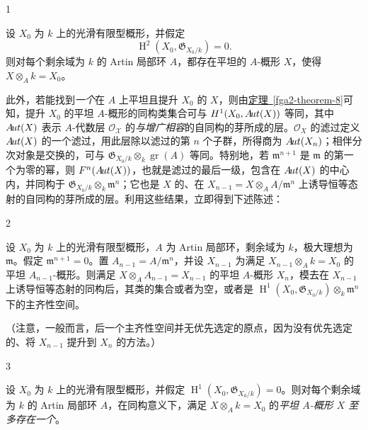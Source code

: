 \begin{corollary}{1}\label{fga2-theorem-8-corollary-1}\skipsinglepar
\par{}设 \(X_0\) 为 \(k\) 上的光滑有限型概形，并假定 \[       \operatorname {H}^2(X_0,\mathfrak {G}_{X_0/k})       = 0.     \] 则对每个剩余域为 \(k\) 的 Artin 局部环 \(A\)，都存在平坦的 \(A\)-概形 \(X\)，使得 \(X\otimes _A k=X_0\)。\end{corollary}
\par{}此外，若能找到\emph{一个}在 \(A\) 上平坦且提升 \(X_0\) 的 \(X\)，则由\hyperref[fga2-theorem-8]{定理~\ref*{fga2-theorem-8}}可知，提升 \(X_0\) 的平坦 \(A\)-概形的同构类集合可与 \(\operatorname {H}^1(X_0,\mathscr {A}\kern  -1.75pt\mathit {ut}(X))\) 等同，其中 \(\mathscr {A}\kern  -1.75pt\mathit {ut}(X)\) 表示 \(A\)-代数层 \(\mathscr {O_X}\) 的\emph{与增广相容}的自同构的芽所成的层。\(\mathcal {O}_X\) 的滤过定义 \(\mathscr {A}\kern  -1.75pt\mathit {ut}(X)\) 的一个滤过，用此层除以滤过的第 \(n\) 个子群，所得商为 \(\mathscr {A}\kern  -1.75pt\mathit {ut}(X_n)\)；相伴分次对象是交换的，可与 \(\mathfrak {G}_{X_0/k}\otimes _k\operatorname {gr}(A)\) 等同。特别地，若 \(\mathfrak {m}^{n+1}\) 是 \(\mathfrak {m}\) 的第一个为零的幂，则 \(F^n(\mathscr {A}\kern  -1.75pt\mathit {ut}(X))\)，也就是滤过的最后一级，包含在 \(\mathscr {A}\kern  -1.75pt\mathit {ut}(X)\) 的中心内，并同构于 \(\mathfrak {G}_{X_0/k}\otimes _k\mathfrak {m}^n\)；它也是 \(X\) 的、在 \(X_{n-1}=X\otimes _A A/\mathfrak {m}^n\) 上诱导恒等态射的自同构的芽所成的层。利用这些结果，立即得到下述陈述：
\begin{corollary}{2}\label{fga2-theorem-8-corollary-2}\skipsinglepar
\par{}设 \(X_0\) 为 \(k\) 上的光滑有限型概形，\(A\) 为 Artin 局部环，剩余域为 \(k\)，极大理想为 \(\mathfrak {m}\)。假定 \(\mathfrak {m}^{n+1}=0\)。置 \(A_{n-1}=A/\mathfrak {m}^n\)，并设 \(X_{n-1}\) 为满足 \(X_{n-1}\otimes _Ak=X_0\) 的平坦 \(A_{n-1}\)-概形。则满足 \(X\otimes _AA_{n-1}=X_{n-1}\) 的平坦 \(A\)-概形 \(X_n\)，模去在 \(X_{n-1}\) 上诱导恒等态射的同构后，其类的集合或者为空，或者是 \(\operatorname {H}^1(X_0,\mathfrak {G}_{X_0/k})\otimes _k\mathfrak {m}^n\) 下的主齐性空间。\end{corollary}
\par{}（注意，一般而言，后一个主齐性空间并无优先选定的原点，因为没有优先选定的、将 \(X_{n-1}\) 提升到 \(X_n\) 的方法。）
\begin{corollary}{3}\label{fga2-theorem-8-corollary-3}\skipsinglepar
\par{}设 \(X_0\) 为 \(k\) 上的光滑有限型概形，并假定 \(\operatorname {H}^1(X_0,\mathfrak {G}_{X_0/k})=0\)。则对每个剩余域为 \(k\) 的 Artin 局部环 \(A\)，在同构意义下，满足 \(X\otimes _Ak=X_0\) 的\emph{平坦 \(A\)-概形 \(X\) 至多存在一个}。\end{corollary}
